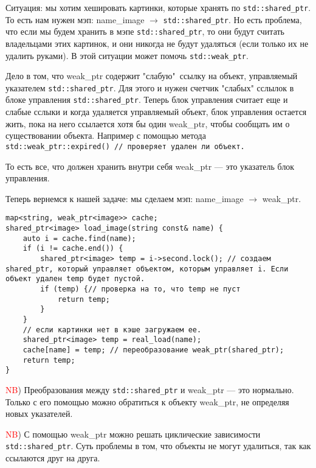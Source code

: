 Ситуация: мы хотим хешировать картинки, которые хранять по \texttt{std::shared_ptr}. То есть нам нужен мэп: name\_image $\to$ \texttt{std::shared_ptr}. Но есть проблема, что если мы будем хранить в мэпе \texttt{std::shared_ptr}, то они будут считать владельцами этих картинок, и они никогда не будут удаляться (если только их не удалить руками). В этой ситуации может помочь \texttt{std::weak_ptr}.


Дело в том, что weak\_ptr содержит "слабую"\ ссылку на объект, управляемый указателем \texttt{std::shared_ptr}. Для этого и нужен счетчик "слабых" сслылок в блоке управления \texttt{std::shared_ptr}. Теперь блок управления считает еще и слабые сслыки и когда удаляется управляемый объект, блок управления остается жить, пока на него ссылается хотя бы один weak\_ptr, чтобы сообщать им о существовании объекта. Например с помощью метода \texttt{std::weak_ptr::expired() // проверяет удален ли объект.}


То есть все, что должен хранить внутри себя weak\_ptr --- это указатель блок управления.


Теперь вернемся к нашей задаче: мы сделаем мэп: name\_image $\to$ weak\_ptr.
\begin{verbatim}
map<string, weak_ptr<image>> cache;
shared_ptr<image> load_image(string const& name) {
    auto i = cache.find(name);
    if (i != cache.end()) {
        shared_ptr<image> temp = i->second.lock(); // создаем shared_ptr, который управляет объектом, которым управляет i. Если объект удален temp будет пустой.
        if (temp) {// проверка на то, что temp не пуст
            return temp;
        }
    }
    // если картинки нет в кэше загружаем ее.
    shared_ptr<image> temp = real_load(name);
    cache[name] = temp; // переобразование weak_ptr(shared_ptr);
    return temp;
}

\end{verbatim}


\textcolor{red}{NB}) Преобразования между \texttt{std::shared_ptr} и weak\_ptr --- это нормально. Только с его помощью можно обратиться к объекту weak\_ptr, не определяя новых указателей.


\textcolor{red}{NB}) С помощью weak\_ptr можно решать циклические зависимости \texttt{std::shared_ptr}. Суть проблемы в том, что объекты не могут удалиться, так как ссылаются друг на друга.

